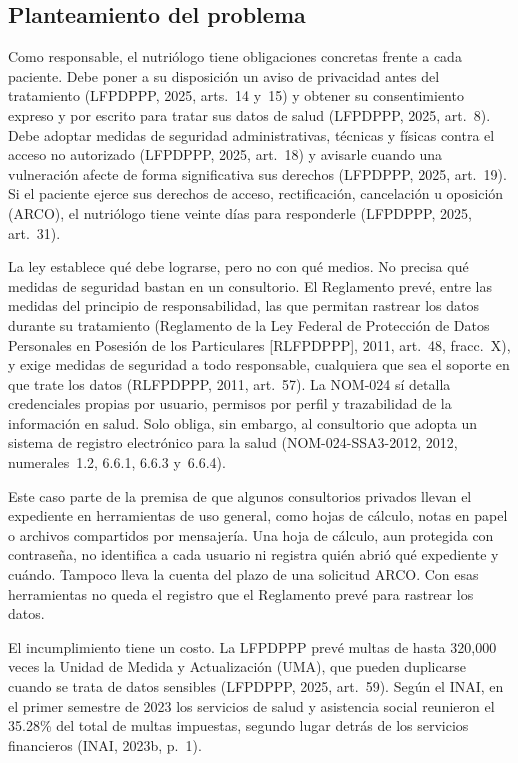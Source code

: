 \documentclass[12pt, a4paper]{article}
\begin{document}
\subsection{Planteamiento del problema}
Como responsable, el nutriólogo tiene obligaciones concretas frente a
cada paciente. Debe poner a su disposición un aviso de privacidad antes
del tratamiento (LFPDPPP, 2025, arts.~14 y~15) y obtener su
consentimiento expreso y por escrito para tratar sus datos de salud
(LFPDPPP, 2025, art.~8). Debe adoptar medidas de seguridad
administrativas, técnicas y físicas contra el acceso no autorizado
(LFPDPPP, 2025, art.~18) y avisarle cuando una vulneración afecte de
forma significativa sus derechos (LFPDPPP, 2025, art.~19). Si el
paciente ejerce sus derechos de acceso, rectificación, cancelación u
oposición (ARCO), el nutriólogo tiene veinte días para responderle
(LFPDPPP, 2025, art.~31).
 
La ley establece qué debe lograrse, pero no con qué medios. No precisa
qué medidas de seguridad bastan en un consultorio. El Reglamento prevé,
entre las medidas del principio de responsabilidad, las que permitan
rastrear los datos durante su tratamiento (Reglamento de la Ley Federal
de Protección de Datos Personales en Posesión de los Particulares
[RLFPDPPP], 2011, art.~48, fracc.~X), y exige medidas de seguridad a todo
responsable, cualquiera que sea el soporte en que trate los datos
(RLFPDPPP, 2011, art.~57). La NOM-024 sí detalla
credenciales propias por usuario, permisos por perfil y trazabilidad de
la información en salud. Solo obliga, sin embargo, al consultorio que
adopta un sistema de registro electrónico para la salud
(NOM-024-SSA3-2012, 2012, numerales~1.2, 6.6.1, 6.6.3 y~6.6.4).
 
Este caso parte de la premisa de que algunos consultorios privados
llevan el expediente en herramientas de uso general, como hojas de
cálculo, notas en papel o archivos compartidos por mensajería. Una hoja
de cálculo, aun protegida con contraseña, no identifica a cada usuario
ni registra quién abrió qué expediente y cuándo. Tampoco lleva la
cuenta del plazo de una solicitud ARCO. Con esas herramientas no queda
el registro que el Reglamento prevé para rastrear los datos.
 
El incumplimiento tiene un costo. La LFPDPPP prevé multas de hasta
320,000 veces la Unidad de Medida y Actualización (UMA), que pueden
duplicarse cuando se trata de datos sensibles (LFPDPPP, 2025,
art.~59). Según el INAI, en el primer semestre de 2023 los servicios de
salud y asistencia social reunieron el 35.28\% del total de multas
impuestas, segundo lugar detrás de los servicios financieros (INAI,
2023b, p.~1).
 
\end{document}
